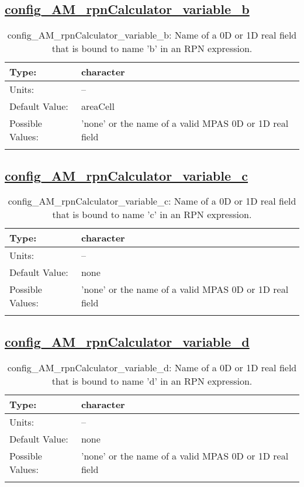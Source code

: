 \subsection[config\_AM\_rpnCalculator\_variable\_b]{\hyperref[sec:nm_tab_AM_rpnCalculator]{config\_AM\_rpnCalculator\_variable\_b}}
\label{subsec:nm_sec_config_AM_rpnCalculator_variable_b}
\begin{center}
\begin{longtable}{| p{2.0in} || p{4.0in} |}
    \hline
    Type: & character \\
    \hline
    Units: & -- \\
    \hline
    Default Value: & areaCell \\
    \hline
    Possible Values: & 'none' or the name of a valid MPAS 0D or 1D real field \\
    \hline
    \caption{config\_AM\_rpnCalculator\_variable\_b: Name of a 0D or 1D real field that is bound to name 'b' in an RPN expression.}
\end{longtable}
\end{center}
\subsection[config\_AM\_rpnCalculator\_variable\_c]{\hyperref[sec:nm_tab_AM_rpnCalculator]{config\_AM\_rpnCalculator\_variable\_c}}
\label{subsec:nm_sec_config_AM_rpnCalculator_variable_c}
\begin{center}
\begin{longtable}{| p{2.0in} || p{4.0in} |}
    \hline
    Type: & character \\
    \hline
    Units: & -- \\
    \hline
    Default Value: & none \\
    \hline
    Possible Values: & 'none' or the name of a valid MPAS 0D or 1D real field \\
    \hline
    \caption{config\_AM\_rpnCalculator\_variable\_c: Name of a 0D or 1D real field that is bound to name 'c' in an RPN expression.}
\end{longtable}
\end{center}
\subsection[config\_AM\_rpnCalculator\_variable\_d]{\hyperref[sec:nm_tab_AM_rpnCalculator]{config\_AM\_rpnCalculator\_variable\_d}}
\label{subsec:nm_sec_config_AM_rpnCalculator_variable_d}
\begin{center}
\begin{longtable}{| p{2.0in} || p{4.0in} |}
    \hline
    Type: & character \\
    \hline
    Units: & -- \\
    \hline
    Default Value: & none \\
    \hline
    Possible Values: & 'none' or the name of a valid MPAS 0D or 1D real field \\
    \hline
    \caption{config\_AM\_rpnCalculator\_variable\_d: Name of a 0D or 1D real field that is bound to name 'd' in an RPN expression.}
\end{longtable}
\end{center}
